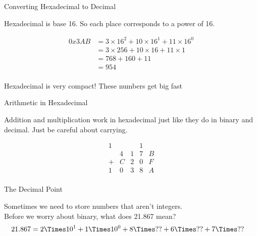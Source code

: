 \begin{frame}{Converting Hexadecimal to Decimal}

    Hexadecimal is base 16. So each place corresponds to a power of 16.

    \begin{align*}
        0x3AB & = 3 \times 16^2 + 10 \times 16^1 + 11 \times 16^0 \\
              & = 3 \times 256 + 10 \times 16 + 11 \times 1       \\
              & = 768 + 160 + 11                                  \\
              & = 954                                             \\
    \end{align*}

    Hexadecimal is very compact! These numbers get big fast

\end{frame}

\begin{frame}{Arithmetic in Hexadecimal}

    Addition and multiplication work in hexadecimal just like they do in binary and
    decimal. Just be careful about carrying.

    \[
        \begin{array}{ccccc}
            1 &   &   & 1 &   \\
              & 4 & 1 & 7 & B \\
            + & C & 2 & 0 & F \\
            \hline
            1 & 0 & 3 & 8 & A \\
        \end{array}
    \]

\end{frame}


\begin{frame}{The Decimal Point}

    Sometimes we need to store numbers that aren't integers. \\

    Before we worry about binary, what does 21.867 mean? \\

    \begin{align*}
        21.867 & = 2 \Times 10^1 + 1 \Times 10^0 + 8 \Times ?? + 6 \Times ?? + 7 \Times ??
    \end{align*}

\end{frame}

